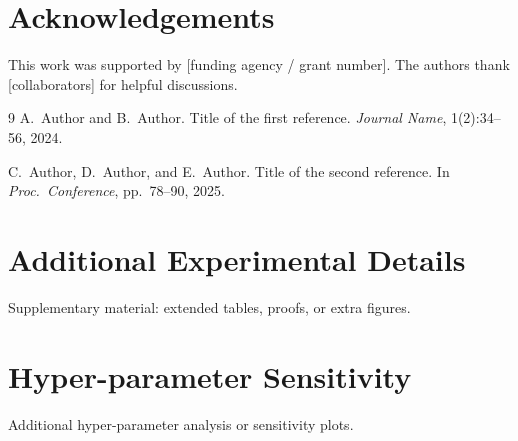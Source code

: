 \documentclass[10pt,a4paper]{article}
\begin{document}
\section*{Acknowledgements}
{\small This work was supported by [funding agency / grant number].
The authors thank [collaborators] for helpful discussions.}

{\small
% 
\begin{thebibliography}{9}
  A.~Author and B.~Author.
  Title of the first reference.
  \emph{Journal Name}, 1(2):34--56, 2024.

  C.~Author, D.~Author, and E.~Author.
  Title of the second reference.
  In \emph{Proc.\ Conference}, pp.\ 78--90, 2025.
\end{thebibliography}
}

\newpage
\appendix
\section{Additional Experimental Details}
\label{app:details}

Supplementary material: extended tables, proofs, or extra figures.

\section{Hyper-parameter Sensitivity}
\label{app:hyperparams}

Additional hyper-parameter analysis or sensitivity plots.
\end{document}
